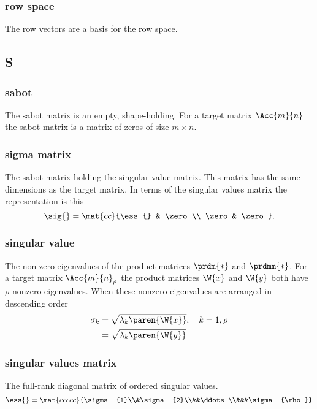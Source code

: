 \subsubsection*{row space}
The row vectors are a basis for the row space.

\subsection*{S} 

\subsubsection*{sabot}
The sabot matrix is an empty, shape-holding. For a target matrix $\Acc{m}{n}$ the sabot matrix is a matrix of zeros of size $m \times n$.

\subsubsection*{sigma matrix}
The sabot matrix holding the singular value matrix. This matrix has the same dimensions as the target matrix. In terms of the singular values matrix the representation is this
\begin{equation}
  \sig{}=\mat{cc}{\ess{} & \zero\\ \zero & \zero}.
\end{equation}

\subsubsection*{singular value}
The non-zero eigenvalues of the product matrices $\prdm{*}$ and $\prdmm{*}$. For a target matrix $\Acc{m}{n}_{\rho}$ the product matrices $\W{x}$ and $\W{y}$ both have $\rho$ nonzero eigenvalues. When these nonzero eigenvalues are arranged in descending order
\begin{equation}
  \begin{split}
    \sigma_{k} &= \sqrt{\lambda_{k}\paren{\W{x}}}, \quad k=1,\rho\\
               &= \sqrt{\lambda_{k}\paren{\W{y}}}
  \end{split}
\end{equation}

\subsubsection*{singular values matrix}
The full-rank diagonal matrix of ordered singular values.
\begin{equation}
  \ess{}=\mat{ccccc}{\sigma_{1}\\&\sigma_{2}\\&&\ddots\\&&&\sigma_{\rho}}
\end{equation}


